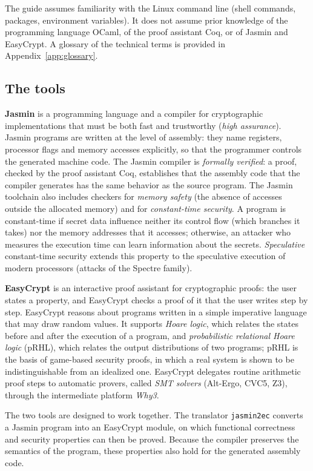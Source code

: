 \documentclass[11pt,a4paper]{article}
\begin{document}
The guide assumes familiarity with the Linux command line (shell commands,
packages, environment variables). It does not assume prior knowledge of the
programming language OCaml, of the proof assistant Coq, or of Jasmin and
EasyCrypt. A glossary of the technical terms is provided in
Appendix~\ref{app:glossary}.

\subsection{The tools}

\textbf{Jasmin} is a programming language and a compiler for cryptographic
implementations that must be both fast and trustworthy (\emph{high
assurance}). Jasmin programs are written at the level of assembly: they name
registers, processor flags and memory accesses explicitly, so that the
programmer controls the generated machine code. The Jasmin compiler is
\emph{formally verified}: a proof, checked by the proof assistant Coq,
establishes that the assembly code that the compiler generates has the same
behavior as the source program. The Jasmin toolchain also includes checkers
for \emph{memory safety} (the absence of accesses outside the allocated
memory) and for
\emph{constant-time security}. A program is constant-time if secret data
influence neither its control flow (which branches it takes) nor the memory
addresses that it accesses; otherwise, an attacker who measures the
execution time can learn information about the secrets. \emph{Speculative}
constant-time security extends this property to the speculative execution
of modern processors (attacks of the Spectre family).

\textbf{EasyCrypt} is an interactive proof assistant for cryptographic
proofs: the user states a property, and EasyCrypt checks a proof of it
that the user writes step by step. EasyCrypt reasons about programs written
in a simple imperative language that may draw random values. It supports
\emph{Hoare logic}, which relates the states before and after the execution
of a program, and \emph{probabilistic relational Hoare logic} (pRHL),
which relates the output distributions of two programs; pRHL is the basis of
game-based security proofs, in which a real system is shown to be
indistinguishable from an idealized one. EasyCrypt delegates routine
arithmetic proof steps to automatic provers, called \emph{SMT solvers}
(Alt-Ergo, CVC5, Z3), through the intermediate platform \emph{Why3}.

The two tools are designed to work together. The translator
\texttt{jasmin2ec} converts a Jasmin program into an EasyCrypt module, on
which functional correctness and security properties can then be proved.
Because the compiler preserves the semantics of the program, these
properties also hold for the generated assembly code.
\end{document}
